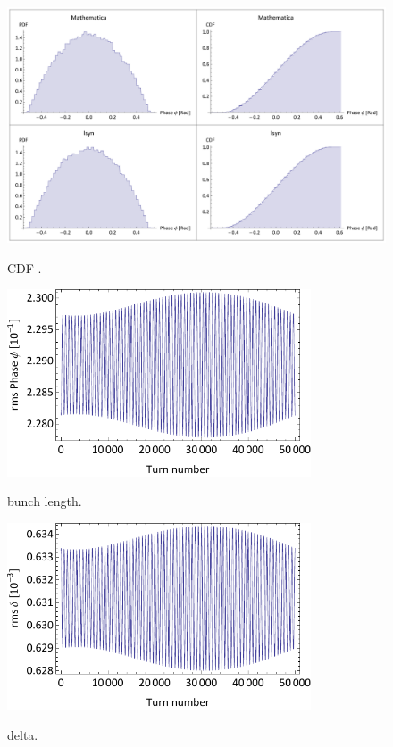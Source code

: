 \begin{figure}[h!]
  \centering
  \includegraphics[width=13cm]{benchmarks/pics/FinalCDFplots.pdf}\\
  \caption{CDF .}
\label{fig:rfsetting}
\end{figure}

\begin{figure}[h!]
  \centering
  \includegraphics[width=9cm]{benchmarks/pics/StatBucketbl.pdf}\\
  \caption{bunch length.}
\label{fig:rfsetting}
\end{figure}

\begin{figure}[h!]
  \centering
  \includegraphics[width=9cm]{benchmarks/pics/StatBucketdelta.pdf}\\
  \caption{delta.}
\label{fig:rfsetting}
\end{figure}






